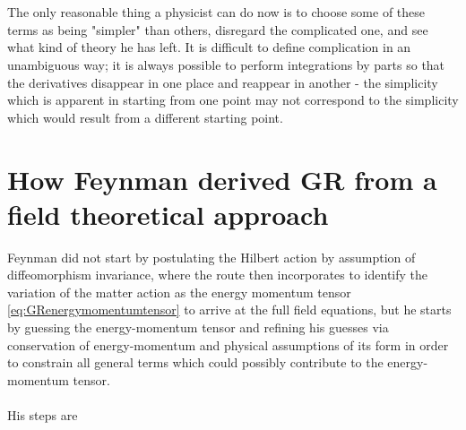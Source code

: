 \\
\\
The only reasonable thing a physicist can do now is to choose some of these terms as being "simpler" than others, disregard the complicated one, and see what kind of theory he has left. It is difficult to define complication in an unambiguous way; it is always possible to perform integrations by parts so that the derivatives disappear in one place and reappear in another - the simplicity which is apparent in starting from one point may not correspond to the simplicity which would result from a different starting point.


\section{How Feynman derived GR from a field theoretical approach}
Feynman did not start by postulating the Hilbert action by assumption of diffeomorphism invariance, where the route then incorporates to identify the variation of the matter action as the energy momentum tensor \ref{eq:GRenergymomentumtensor} to arrive at the full field equations, but he starts by guessing the energy-momentum tensor and refining his guesses via conservation of energy-momentum and physical assumptions of its form in order to constrain all general terms which could possibly contribute to the energy-momentum tensor.\\
\\
His steps are
